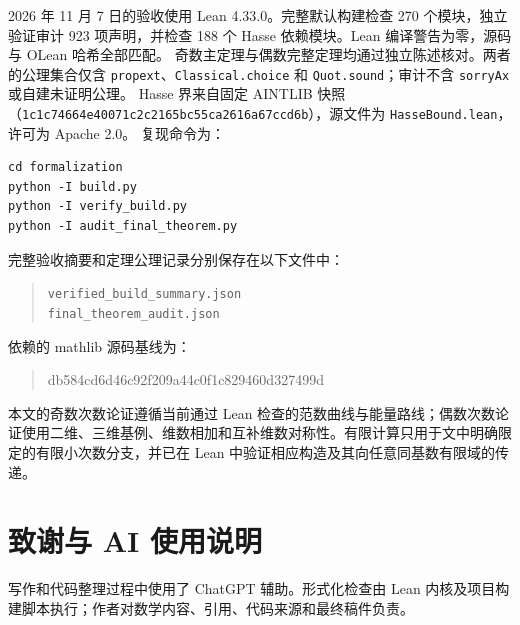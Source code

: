 \documentclass[UTF8,a4paper,11pt]{ctexart}
\numberwithin{equation}{section}
\theoremstyle{definition}
\theoremstyle{remark}
\begin{document}
{\raggedright
2026 年 11 月 7 日的验收使用 Lean 4.33.0。完整默认构建检查 270 个模块，独立验证审计 923 项声明，并检查 188 个 Hasse 依赖模块。Lean 编译警告为零，源码与 OLean 哈希全部匹配。
奇数主定理与偶数完整定理均通过独立陈述核对。两者的公理集合仅含 \texttt{propext}、\texttt{Classical.choice} 和 \texttt{Quot.sound}；审计不含 \texttt{sorryAx} 或自建未证明公理。
Hasse 界来自固定 AINTLIB 快照\cite{AINTLIB}（\texttt{1c1c7466\allowbreak 4e40071c\allowbreak 2c2165bc\allowbreak 55ca2616\allowbreak a67ccd6b}），源文件为 \texttt{HasseBound.lean}，许可为 Apache 2.0。
复现命令为：
\par}
\begin{verbatim}
cd formalization
python -I build.py
python -I verify_build.py
python -I audit_final_theorem.py
\end{verbatim}
完整验收摘要和定理公理记录分别保存在以下文件中：\par
\begin{quote}\small\texttt{verified\_build\_summary.json}\\
\texttt{final\_theorem\_audit.json}\end{quote}
依赖的 mathlib 源码基线为：\par
\begin{quote}\small\ttfamily db584cd6d46c92f209a44c0f1c829460d327499d\end{quote}

本文的奇数次数论证遵循当前通过 Lean 检查的范数曲线与能量路线；偶数次数论证使用二维、三维基例、维数相加和互补维数对称性。有限计算只用于文中明确限定的有限小次数分支，并已在 Lean 中验证相应构造及其向任意同基数有限域的传递。


\section*{致谢与 AI 使用说明}
写作和代码整理过程中使用了 ChatGPT 辅助。形式化检查由 Lean 内核及项目构建脚本执行；作者对数学内容、引用、代码来源和最终稿件负责。
\end{document}
